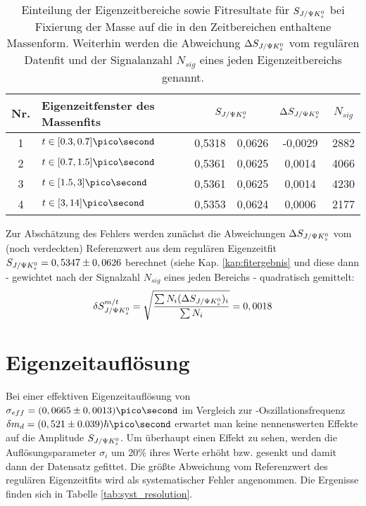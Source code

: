 \begin{table}[hptb]
\centering
\caption{Einteilung der Eigenzeitbereiche sowie Fitresultate für $S_{J/\Psi K_s^0}$ bei Fixierung der Masse auf die in den Zeitbereichen enthaltene Massenform. Weiterhin werden die Abweichung $\Delta S_{J/\Psi K_s^0}$ vom regulären Datenfit und der Signalanzahl $N_{sig}$ eines jeden Eigenzeitbereichs genannt.}
\label{tab:mass_ct}
\begin{tabular}{c l r@{$\pm$}l c c}
\hline \hline
Nr. & Eigenzeitfenster des Massenfits & \multicolumn{2}{c}{$S_{J/\Psi K_s^0}$} & $\Delta S_{J/\Psi K_s^0}$ & $N_{sig}$\\ \hline
1 & $t \in [0.3, 0.7] \pico\second$ & 0,5318 & 0,0626 & -0,0029 & 2882 \\
2 & $t \in [0.7, 1.5] \pico\second$ & 0,5361 & 0,0625 & 0,0014 & 4066 \\
3 & $t \in [1.5, 3] \pico\second$ & 0,5361 & 0,0625 & 0,0014 & 4230 \\
4 & $t \in [3, 14] \pico\second$ & 0,5353 & 0,0624 & 0,0006 & 2177 \\ \hline \hline
\end{tabular}
\end{table}

Zur Abschätzung des Fehlers werden zunächst die Abweichungen $\Delta S_{J/\Psi K_s^0}$ vom (noch verdeckten) Referenzwert aus dem regulären Eigenzeitfit $S_{J/\Psi K_s^0} = 0,5347 \pm 0,0626$ berechnet (siehe Kap. \ref{kap:fitergebnis} und diese dann - gewichtet nach der Signalzahl $N_{sig}$ eines jeden Bereichs - quadratisch gemittelt:
\begin{align}
\delta S_{J/\Psi K_s^0}^{m/t} = \sqrt{\frac{\sum N_i (\Delta S_{J/\Psi K_s^0})_i}{\sum N_i}} = 0,0018
\end{align}

\section{Eigenzeitauflösung} \label{kap:aufloesung}
Bei einer effektiven Eigenzeitauflösung von $\sigma_{eff} = (0,0665 \pm 0,0013)\ps$ im Vergleich zur \Bd-Oszillationsfrequenz $\delta m_d = (0,521 \pm 0.039)\hbar\ps$ erwartet man keine nennenswerten Effekte auf die Amplitude $S_{J/\Psi K_s^0}$. Um überhaupt einen Effekt zu sehen, werden die Auflösungsparameter $\sigma_i$ um 20\% ihres Werte erhöht bzw. gesenkt und damit dann der Datensatz gefittet. Die größte Abweichung vom Referenzwert des regulären Eigenzeitfits wird als systematischer Fehler angenommen. Die Ergenisse finden sich in Tabelle \ref{tab:syst_resolution}.

